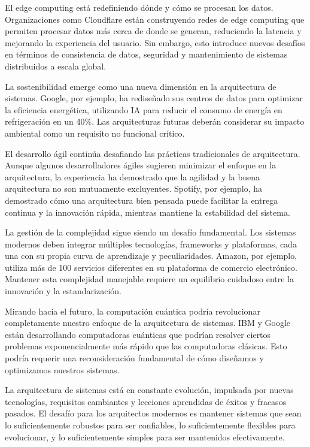 El edge computing está redefiniendo dónde y cómo se procesan los datos. Organizaciones como Cloudflare están construyendo redes de edge computing que permiten procesar datos más cerca de donde se generan, reduciendo la latencia y mejorando la experiencia del usuario. Sin embargo, esto introduce nuevos desafíos en términos de consistencia de datos, seguridad y mantenimiento de sistemas distribuidos a escala global.

La sostenibilidad emerge como una nueva dimensión en la arquitectura de sistemas. Google, por ejemplo, ha rediseñado sus centros de datos para optimizar la eficiencia energética, utilizando IA para reducir el consumo de energía en refrigeración en un 40\%. Las arquitecturas futuras deberán considerar su impacto ambiental como un requisito no funcional crítico.

El desarrollo ágil continúa desafiando las prácticas tradicionales de arquitectura. Aunque algunos desarrolladores ágiles sugieren minimizar el enfoque en la arquitectura, la experiencia ha demostrado que la agilidad y la buena arquitectura no son mutuamente excluyentes. Spotify, por ejemplo, ha demostrado cómo una arquitectura bien pensada puede facilitar la entrega continua y la innovación rápida, mientras mantiene la estabilidad del sistema.

La gestión de la complejidad sigue siendo un desafío fundamental. Los sistemas modernos deben integrar múltiples tecnologías, frameworks y plataformas, cada una con su propia curva de aprendizaje y peculiaridades. Amazon, por ejemplo, utiliza más de 100 servicios diferentes en su plataforma de comercio electrónico. Mantener esta complejidad manejable requiere un equilibrio cuidadoso entre la innovación y la estandarización.

Mirando hacia el futuro, la computación cuántica podría revolucionar completamente nuestro enfoque de la arquitectura de sistemas. IBM y Google están desarrollando computadoras cuánticas que podrían resolver ciertos problemas exponencialmente más rápido que las computadoras clásicas. Esto podría requerir una reconsideración fundamental de cómo diseñamos y optimizamos nuestros sistemas.

La arquitectura de sistemas está en constante evolución, impulsada por nuevas tecnologías, requisitos cambiantes y lecciones aprendidas de éxitos y fracasos pasados. El desafío para los arquitectos modernos es mantener sistemas que sean lo suficientemente robustos para ser confiables, lo suficientemente flexibles para evolucionar, y lo suficientemente simples para ser mantenidos efectivamente.
